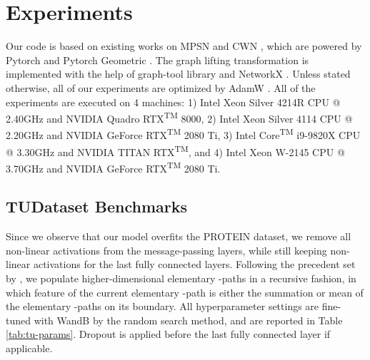 \documentclass[letterpaper]{article} \usepackage{aaai24}  \usepackage{times}  \usepackage{helvet}  \usepackage{courier}  \usepackage[hyphens]{url}  \usepackage{graphicx} \urlstyle{rm} \def\UrlFont{\rm}  \usepackage{natbib}  \usepackage{caption} \frenchspacing  \setlength{\pdfpagewidth}{8.5in} \setlength{\pdfpageheight}{11in} \usepackage{algorithm}
\begin{document}
\section{Experiments} \label{app:experiments}
Our code is based on existing works on MPSN \cite{bodnar_weisfeiler_2021} and CWN \cite{bodnar_weisfeiler_2022}, which are  powered by Pytorch \cite{paszke_pytorch_2019} and Pytorch Geometric \cite{fey_fast_2019}. The graph lifting transformation is implemented with the help of graph-tool library \cite{peixoto_graph-tool_2014} and NetworkX \cite{hagberg_exploring_2008}. Unless stated otherwise, all of our experiments are optimized by AdamW \cite{loschilov_decoupled_2019}. All of the experiments are executed on 4 machines: 1) Intel\textsuperscript{\textregistered} Xeon\textsuperscript{\textregistered} Silver 4214R CPU @ 2.40GHz and NVIDIA\textsuperscript{\textregistered} Quadro RTX\textsuperscript{TM} 8000, 2) Intel\textsuperscript{\textregistered} Xeon\textsuperscript{\textregistered} Silver 4114 CPU @ 2.20GHz and NVIDIA\textsuperscript{\textregistered} GeForce\textsuperscript{\textregistered} RTX\textsuperscript{TM} 2080 Ti, 3) Intel\textsuperscript{\textregistered} Core\textsuperscript{TM} i9-9820X CPU @ 3.30GHz and NVIDIA\textsuperscript{\textregistered} TITAN RTX\textsuperscript{TM}, and 4) Intel\textsuperscript{\textregistered} Xeon\textsuperscript{\textregistered} W-2145 CPU @ 3.70GHz and NVIDIA\textsuperscript{\textregistered} GeForce\textsuperscript{\textregistered} RTX\textsuperscript{TM} 2080 Ti.

\subsection{TUDataset Benchmarks} \label{subsec:appendix-tu}

Since we observe that our model overfits the PROTEIN dataset, we remove all non-linear activations from the message-passing layers, while still keeping non-linear activations for the last fully connected layers. Following the precedent set by \cite{bodnar_weisfeiler_2021,bodnar_weisfeiler_2022}, we populate higher-dimensional elementary -paths in a recursive fashion, in which feature of the current elementary -path is either the summation or mean of the elementary -paths on its boundary. All hyperparameter settings are fine-tuned with WandB \cite{wandb} by the random search method, and are reported in Table \ref{tab:tu-params}. Dropout \cite{srivastava_dropout_2014} is applied before the last fully connected layer if applicable.
\end{document}
